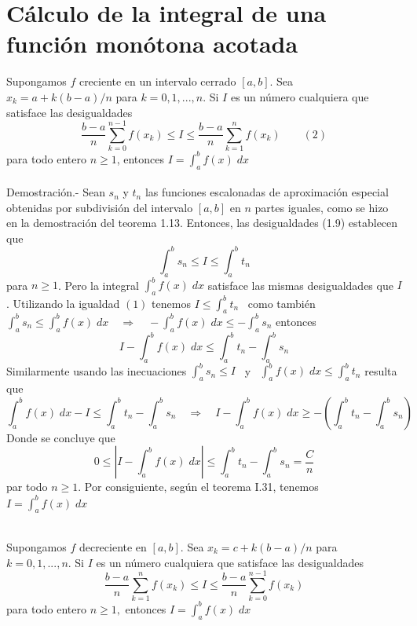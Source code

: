\section{Cálculo de la integral de una función monótona acotada}

\begin{teo} Supongamos $f$ creciente en un intervalo cerrado $[a,b]$. Sea $x_k = a + k(b-a)/n$ para $k=0,1,...,n$. Si $I$ es un número cualquiera que satisface las desigualdades $$\dfrac{b-a}{n}\sum\limits_{k=0}^{n-1} f(x_k)\leq I \leq \dfrac{b-a}{n}\sum\limits_{k=1}^n f(x_k) \qquad (2)$$
    para todo entero $n\geq 1$, entonces $I=\int_a^b f(x) \; dx$\\\\
    Demostración.-\; Sean $s_n$ y $t_n$ las funciones escalonadas de aproximación especial obtenidas por subdivisión del intervalo $[a,b]$ en $n$ partes iguales, como se hizo en la demostración del teorema 1.13. Entonces, las desigualdades (1.9) establecen que $$\int_a^b s_n \leq I \leq \int_a^b t_n$$
    para $n\geq 1$. Pero la integral $\int_a^b f(x) \; dx$ satisface las mismas desigualdades que $I$. Utilizando la igualdad $(1)$ tenemos $I\leq \int_a^b t_n$ \, como también \, $\int_a^b s_n \leq \int_a^b f(x) \; dx \quad \Longrightarrow\quad  - \int_a^b f(x) \; dx \leq -\int_a^b s_n$ entonces $$I-\int_a^b f(x)\; dx \leq \int_a^b t_n - \int_a^b s_n$$
    Similarmente usando las inecuaciones $\int_a^b s_n \leq I$ \, y \, $\int_a^b f(x) \; dx \leq \int_a^b t_n$ resulta que $$\int_a^b f(x) \; dx - I \leq \int_a^b t_n - \int_a^b s_n \quad \Longrightarrow \quad I - \int_a^b f(x) \; dx \geq - \left(\int_a^b t_n - \int_a^b s_n\right)$$ 
    Donde se concluye que $$0\leq \left| I - \int_a^b f(x) \; dx \right| \leq \int_a^b t_n - \int_a^b s_n = \dfrac{C}{n}$$
    par todo $n\geq 1$. Por consiguiente, según el teorema I.31, tenemos $I=\int_a^b f(x) \; dx$\\\\
\end{teo}

\begin{teo} Supongamos $f$ decreciente en $[a,b]$. Sea $x_k=c+k(b-a)/n$ para $k=0,1,...,n$. Si $I$ es un número cualquiera que satisface las desigualdades $$\dfrac{b-a}{n} \sum\limits_{k=1}^n f(x_k) \leq I \leq \dfrac{b-a}{n} \sum\limits_{k=0}^{n-1} f(x_k)$$
    para todo entero $n\geq 1,$ entonces $I=\int_a^b f(x) \; dx$\\\\
\end{teo}


